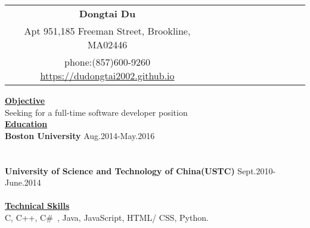 \documentclass{resume} %
\begin{document}
 \small
\begin{spacing}{1}
\vspace{-0.5in}

\begin{center}
\begin{tabular}{*{11}{c}}
    \vspace{-0.5pt}
    \textbf{\Huge{Dongtai Du}}\\
    {\footnotesize Apt 951,185 Freeman Street, Brookline, MA02446} \\
    {\footnotesize phone:(857)600-9260} \hspace{1cm} {\footnotesize \url{https://dudongtai2002.github.io}}\hspace{1cm}{\footnotesize \url{Email:dudongtai2002@gmail.com}} \\
\end{tabular}

\uline{{\bf{\LARGE Objective}}\hfill{\hspace{15cm}{}}} \\
\vspace{1mm}
\hspace{-11.8cm} {Seeking for a full-time software developer position}
\vspace{4mm}\\
\uline{{\bf{\LARGE Education}}\hfill{\hspace{15cm}{}}} \\
\vspace{1mm}
{\bf Boston University \hspace{3cm} } \hfill {\hspace{2cm}Aug.2014-May.2016} \\
\hspace{3cm}
\\
\hspace{3.0cm}{Advanced Data Structure, Cloud Computing, Machine Learning}\\
{\bf University of Science and Technology of China(USTC) \hspace{1.8cm} } \hfill {Sept.2010-June.2014} \\
\hspace{-17.2cm}{B.S. in Physics} \hspace{1.66cm}\\

\vspace{3mm}
\uline{{\bf{\LARGE Technical Skills}}\hfill{\hspace{10cm}{}}} \\
\vspace{1mm}
\hspace{-6.0cm}{\bf Languages:} \hspace{2cm} {C, C++,  C\#\ , Java, JavaScript, HTML/ CSS, Python.} \\



\end{center}
\end{spacing}
\end{document}
